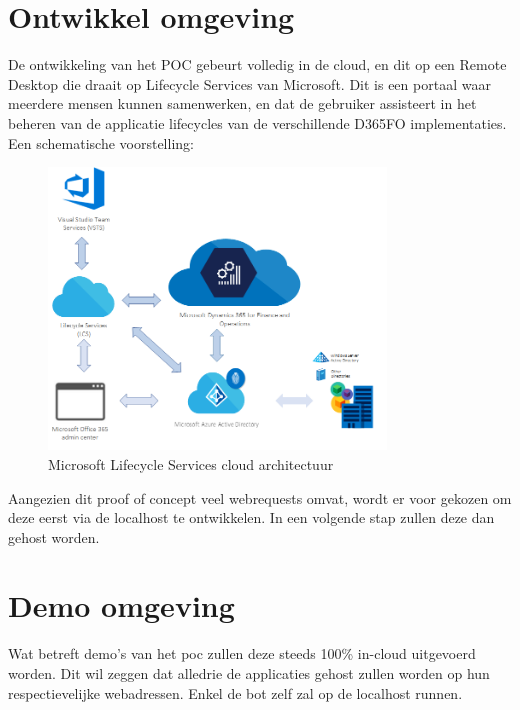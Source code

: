 \section{Ontwikkel omgeving}
De ontwikkeling van het POC gebeurt volledig in de cloud, en dit op een Remote Desktop die draait op Lifecycle Services van Microsoft. Dit is een portaal waar meerdere mensen kunnen samenwerken, en dat de gebruiker assisteert in het beheren van de applicatie lifecycles van de verschillende D365FO implementaties.
Een schematische voorstelling:

\begin{figure}[H]
    \centering
    \includegraphics[width=0.8\textwidth]{img/lcsCloudArchitecture.png}
    \caption{Microsoft Lifecycle Services cloud architectuur}
\end{figure}

Aangezien dit proof of concept veel webrequests omvat, wordt er voor gekozen om deze eerst via de localhost te ontwikkelen. In een volgende stap zullen deze dan gehost worden. 

\section{Demo omgeving}
Wat betreft demo's van het poc zullen deze steeds 100\% in-cloud uitgevoerd worden. Dit wil zeggen dat alledrie de applicaties gehost zullen worden op hun respectievelijke webadressen. Enkel de bot zelf zal op de localhost runnen. 

